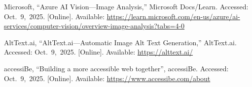 \documentclass[12pt]{article}
\begin{document}
\begin{hangparas}{2em}{1}
  Microsoft, ``Azure AI Vision---Image Analysis,'' Microsoft Docs/Learn.
  Accessed: Oct.~9,~2025. [Online]. Available:
  \url{https://learn.microsoft.com/en-us/azure/ai-services/computer-vision/overview-image-analysis?tabs=4-0}
  \\
  \par
  AltText.ai, ``AltText.ai---Automatic Image Alt Text Generation,'' AltText.ai.
  Accessed: Oct.~9,~2025. [Online]. Available: \url{https://alttext.ai/}
  \\
  \par
  accessiBe, ``Building a more accessible web together'', accessiBe.
  Accessed: Oct.~9,~2025. [Online]. Available:
  \url{https://www.accessibe.com/about}
\end{hangparas}
\end{document}
